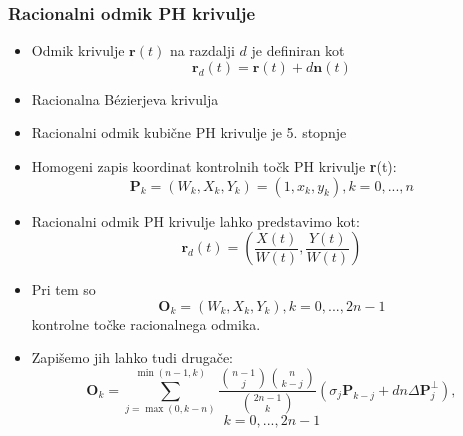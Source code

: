 \documentclass[12pt]{beamer}
\theoremstyle{definition} %
\theoremstyle{plain} %
\begin{document}
\begin{frame}
    \frametitle{Racionalni odmik PH krivulje}
        \begin{itemize}
            \item Odmik krivulje $\textbf{r}(t)$ na razdalji $d$ je definiran kot 
                  $$\textbf{r}_d(t) = \textbf{r}(t) + d \textbf{n}(t)$$
            \item Racionalna B\'ezierjeva krivulja
            \item Racionalni odmik kubične PH krivulje je 5. stopnje
            \item Homogeni zapis koordinat kontrolnih točk PH krivulje \textbf{r}(t):
                  $$ \textbf{P}_k = (W_k, X_k, Y_k) = (1, x_k, y_k), k = 0, ..., n$$
        \end{itemize}
    \end{frame}
    \begin{frame}
        \begin{itemize}
            \item Racionalni odmik PH krivulje lahko predstavimo kot:
                  $$ \textbf{r}_d(t) = \left(\frac{X(t)}{W(t)}, \frac{Y(t)}{W(t)}\right)$$ 
            \item Pri tem so
                  $$\textbf{O}_k = (W_k, X_k, Y_k), k = 0, ..., 2n-1$$
                  kontrolne točke racionalnega odmika.
            \item Zapišemo jih lahko tudi drugače:
                  $$\textbf{O}_k = \sum_{j=\max(0, k-n)}^{\min(n-1, k)} \frac{\binom{n-1}{j} \binom{n}{k-j}}{\binom{2n-1}{k}}(\sigma_j \textbf{P}_{k-j}+ d n \Delta\textbf{P}^\perp_j),$$ 
                  $$k=0, ..., 2n-1$$
        \end{itemize}
    \end{frame}
    
\end{document}

